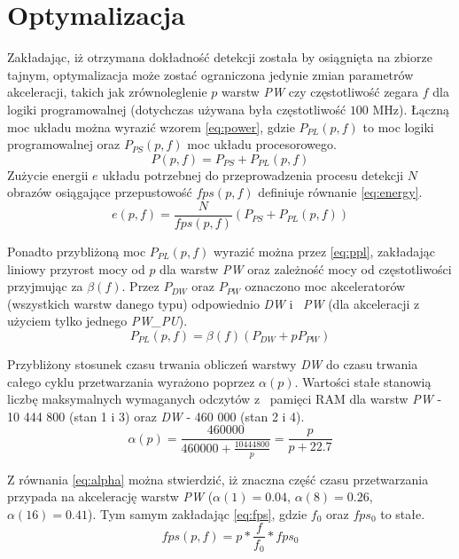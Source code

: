 \section{Optymalizacja}
Zakładając, iż otrzymana dokładność detekcji została by osiągnięta na zbiorze tajnym, optymalizacja może zostać ograniczona jedynie zmian parametrów akceleracji, takich jak zrównoleglenie $p$ warstw \emph{PW} czy częstotliwość zegara $f$ dla logiki programowalnej (dotychczas używana była częstotliwość $100$ MHz).
Łączną moc układu można wyrazić wzorem \eqref{eq:power}, gdzie $P_{PL}(p,f)$ to moc logiki programowalnej oraz $P_{PS}(p,f)$ moc układu procesorowego.
\begin{equation}
P(p,f) = P_{PS} + P_{PL}(p,f)
\label{eq:power}
\end{equation}
Zużycie energii $e$ układu potrzebnej do przeprowadzenia procesu detekcji $N$ obrazów osiągające przepustowość $fps(p,f)$ definiuje równanie \eqref{eq:energy}.
\begin{equation}
e(p,f) = \frac{N}{fps(p,f)}(P_{PS} + P_{PL}(p,f))
\label{eq:energy}
\end{equation}

Ponadto przybliżoną moc $P_{PL}(p,f)$ wyrazić można przez \eqref{eq:ppl}, zakładając liniowy przyrost mocy od $p$ dla warstw \emph{PW} oraz zależność mocy od częstotliwości przyjmując za $\beta(f)$. Przez $P_{DW}$ oraz $P_{PW}$ oznaczono moc akceleratorów (wszystkich warstw danego typu) odpowiednio \emph{DW} i~ \emph{PW} (dla akceleracji z~ użyciem tylko jednego \emph{PW\_PU}).
\begin{equation}
P_{PL}(p,f) = \beta(f) (P_{DW} + p P_{PW})
\label{eq:ppl}
\end{equation}

Przybliżony stosunek czasu trwania obliczeń warstwy \emph{DW} do czasu trwania całego cyklu przetwarzania wyrażono poprzez $\alpha(p)$. 
Wartości stałe stanowią liczbę maksymalnych wymaganych odczytów z~ pamięci RAM dla  warstw \emph{PW} - 10 444 800 (stan 1 i 3) oraz \emph{DW} - 460 000 (stan 2 i 4).
\begin{equation}
\alpha(p) = \frac{460 000}{460 000 + \frac{10 444 800}{p}} = \frac{p}{p+22.7}
\label{eq:alpha}
\end{equation}

Z równania \eqref{eq:alpha} można stwierdzić, iż znaczna część czasu przetwarzania przypada na akcelerację warstw \emph{PW} ($\alpha(1) = 0.04$, $\alpha(8) = 0.26$,  $\alpha(16) = 0.41$).
Tym samym zakładając \eqref{eq:fps}, gdzie $f_0$ oraz $fps_0$ to stałe.
\begin{equation}
fps(p,f) = p*\frac{f}{f_0}* fps_0
\label{eq:fps}
\end{equation}

